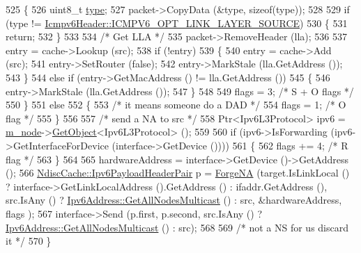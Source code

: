 \begin{DoxyCode}
525     \{
526       uint8\_t \hyperlink{visualizer-ideas_8txt_add98db9e15e2a58cf2b57623e7aa893a}{type};
527       packet->CopyData (&type, \textcolor{keyword}{sizeof}(type));
528 
529       \textcolor{keywordflow}{if} (type != \hyperlink{classns3_1_1Icmpv6Header_a1992e0e28c453f5e23b1ad55a49b7908a07035de174ae9be5f6818c46eb299c48}{Icmpv6Header::ICMPV6\_OPT\_LINK\_LAYER\_SOURCE})
530         \{
531           \textcolor{keywordflow}{return};
532         \}
533 
534       \textcolor{comment}{/* Get LLA */}
535       packet->RemoveHeader (lla);
536 
537       entry = cache->Lookup (src);
538       \textcolor{keywordflow}{if} (!entry)
539         \{
540           entry = cache->Add (src);
541           entry->SetRouter (\textcolor{keyword}{false});
542           entry->MarkStale (lla.GetAddress ());
543         \}
544       \textcolor{keywordflow}{else} \textcolor{keywordflow}{if} (entry->GetMacAddress () != lla.GetAddress ())
545         \{
546           entry->MarkStale (lla.GetAddress ());
547         \}
548 
549       flags = 3; \textcolor{comment}{/* S + O flags */}
550     \}
551   \textcolor{keywordflow}{else}
552     \{
553       \textcolor{comment}{/* it means someone do a DAD */}
554       flags = 1; \textcolor{comment}{/* O flag */}
555     \}
556 
557   \textcolor{comment}{/* send a NA to src */}
558   Ptr<Ipv6L3Protocol> ipv6 = \hyperlink{classns3_1_1Icmpv6L4Protocol_a8968d1631f94f0b1cc1fd0e71ea0d0fe}{m\_node}->\hyperlink{classns3_1_1Object_a13e18c00017096c8381eb651d5bd0783}{GetObject}<Ipv6L3Protocol> ();
559 
560   \textcolor{keywordflow}{if} (ipv6->IsForwarding (ipv6->GetInterfaceForDevice (interface->GetDevice ())))
561     \{
562       flags += 4; \textcolor{comment}{/* R flag */}
563     \}
564 
565   hardwareAddress = interface->GetDevice ()->GetAddress ();
566   \hyperlink{classns3_1_1NdiscCache_a29c07f4c9da0e923f442f6440666240e}{NdiscCache::Ipv6PayloadHeaderPair} p = \hyperlink{classns3_1_1Icmpv6L4Protocol_a687a096d8c5580cb3a80bec95b0dd689}{ForgeNA} (target.IsLinkLocal
       () ? interface->GetLinkLocalAddress ().GetAddress () : ifaddr.GetAddress (), src.IsAny () ? 
      \hyperlink{classns3_1_1Ipv6Address_a11e6e4228d3d6e814b2c5ffc18c8ed20}{Ipv6Address::GetAllNodesMulticast} () : src, &hardwareAddress, flags );
567   interface->Send (p.first, p.second, src.IsAny () ? 
      \hyperlink{classns3_1_1Ipv6Address_a11e6e4228d3d6e814b2c5ffc18c8ed20}{Ipv6Address::GetAllNodesMulticast} () : src);
568 
569   \textcolor{comment}{/* not a NS for us discard it */}
570 \}
\end{DoxyCode}


